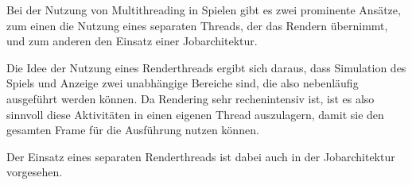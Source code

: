 Bei der Nutzung von Multithreading in Spielen gibt es zwei prominente Ansätze, zum einen die Nutzung eines separaten Threads, der das Rendern übernimmt, und zum anderen den Einsatz einer Jobarchitektur.

Die Idee der Nutzung eines Renderthreads ergibt sich daraus, dass Simulation des Spiels und Anzeige zwei unabhängige Bereiche sind, die also nebenläufig ausgeführt werden können. Da Rendering sehr rechenintensiv ist, ist es also sinnvoll diese Aktivitäten in einen eigenen Thread auszulagern, damit sie den gesamten Frame für die Ausführung nutzen können.

Der Einsatz eines separaten Renderthreads ist dabei auch in der Jobarchitektur vorgesehen.